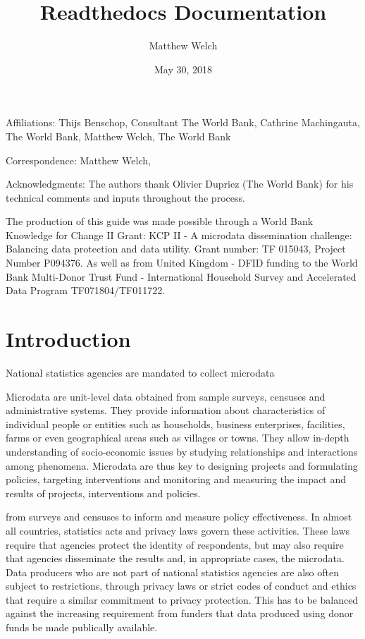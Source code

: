 \documentclass[letterpaper,10pt,english]{sphinxmanual}
\title{Readthedocs Documentation}
\date{May 30, 2018}
\author{Matthew Welch}
\begin{document}
\maketitle
\sphinxtableofcontents
{}\label{\detokenize{index::doc}}





Affiliations: Thijs Benschop, Consultant The World Bank, Cathrine
Machingauta, The World Bank, Matthew Welch, The World Bank

Correspondence: Matthew Welch, 

Acknowledgments: The authors thank Olivier Dupriez (The World Bank) for
his technical comments and inputs throughout the process.

The production of this guide was made possible through a World Bank
Knowledge for Change II Grant: KCP II - A microdata dissemination
challenge: Balancing data protection and data utility. Grant number: TF
015043, Project Number P094376. As well as from United Kingdom - DFID
funding to the World Bank Multi-Donor Trust Fund - International
Household Survey and Accelerated Data Program \textendash{} TF071804/TF011722.


\chapter{Introduction}
\label{\detokenize{intro::doc}}\label{\detokenize{intro:introduction}}\label{\detokenize{intro:statistical-disclosure-control-for-microdata-a-practice-guide}}
National statistics agencies are mandated to collect
microdata %
\begin{footnote}[1]\sphinxAtStartFootnote
Microdata are unit-level data obtained from sample surveys, censuses
and administrative systems. They provide information about
characteristics of individual people or entities such as households,
business enterprises, facilities, farms or even geographical areas
such as villages or towns. They allow in-depth understanding of
socio-economic issues by studying relationships and interactions
among phenomena. Microdata are thus key to designing projects and
formulating policies, targeting interventions and monitoring and
measuring the impact and results of projects, interventions and
policies.
%
\end{footnote} from surveys and censuses to inform and
measure policy effectiveness. In almost all countries, statistics acts
and privacy laws govern these activities. These laws require that
agencies protect the identity of respondents, but may also require that
agencies disseminate the results and, in appropriate cases, the
microdata. Data producers who are not part of national statistics
agencies are also often subject to restrictions, through privacy laws or
strict codes of conduct and ethics that require a similar commitment to
privacy protection. This has to be balanced against the increasing
requirement from funders that data produced using donor funds be made
publically available.
\end{document}

